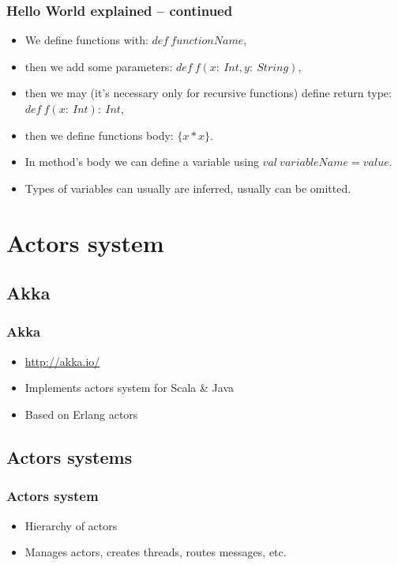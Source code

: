\documentclass[xcolor=dvipsnames]{beamer}
\begin{document}
\begin{frame}
\frametitle{Hello World explained -- continued}
\begin{itemize}
\item We define functions with: $def\:functionName$,
\item then we add some parameters: $def\:f(x:\:Int, y:\:String)$,
\item then we may (it's necessary only for recursive functions) define return type: $def\:f(x:\:Int):\:Int$,
\item then we define functions body: $\{ x * x \}$. %
\item In method's body we can define a variable using $val\:variableName = value$.
\item Types of variables can usually are inferred, usually can be omitted.
\end{itemize}
\end{frame}


\section{Actors system}

\subsection{Akka}

\begin{frame}
\frametitle{Akka}
\begin{itemize}
\item \href{http://akka.io/}{http://akka.io/}
\item Implements actors system for Scala \& Java
\item Based on Erlang actors
\end{itemize}
\end{frame}

\subsection{Actors systems}

\begin{frame}
\frametitle{Actors system}
\begin{itemize}
\item Hierarchy of actors
\item Manages actors, creates threads, routes messages, etc.
\end{itemize}
\end{frame}
\end{document}
